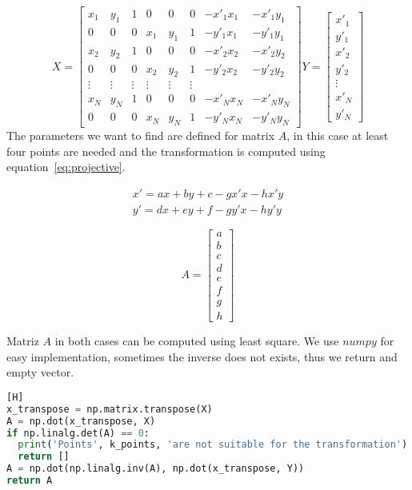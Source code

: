 \begin{itemize}
\[
X = 
\begin{bmatrix}
    x_{1}       & y_{1} & 1 & 0 & 0 & 0 & -x'_1x_1 & -x'_1y_1\\
    0       & 0 & 0 & x_1 & y_1 & 1 & -y'_1x_1 & -y'_1y_1\\
    x_{2}       & y_{2} & 1 & 0 & 0 & 0 & -x'_2x_2 & -x'_2y_2\\
    0       & 0 & 0 & x_2 & y_2 & 1 & -y'_2x_2 & -y'_2y_2 \\
  \vdots & \vdots & \vdots & \vdots & \vdots & \vdots \\

    x_{N}       & y_{N} & 1 & 0 & 0 & 0 & -x'_Nx_N & -x'_Ny_N\\
    0       & 0 & 0 & x_N & y_N & 1 & -y'_Nx_N & -y'_Ny_N 
\end{bmatrix}
%
Y = 
\begin{bmatrix}
    x'_{1} \\
    y'_{1} \\
    x'_{2}      \\
    y'_{2}   \\
 \vdots \\
    x'_{N}      \\
    y'_{N}   
\end{bmatrix}
\]
The parameters we want to find are defined for matrix $A$, in this case at least four points are needed and the transformation is computed using equation~\ref{eq:projective}.

\begin{equation}
\begin{split}
x'= ax+by+c-gx'x-hx'y\\
y'= dx+ey+f -gy'x-hy'y 
\end{split}
\label{eq:projective}
\end{equation}

\[
A = 
\begin{bmatrix}
    a \\
    b \\
    c      \\
    d   \\ 
    e      \\
    f   \\
    g\\
    h
\end{bmatrix}
\]

Matriz $A$ in both cases can be computed using least square. We use $numpy$ for easy implementation, sometimes the inverse does not exists, thus we return and empty vector.
\begin{lstlisting}[language=python][H]
x_transpose = np.matrix.transpose(X)
A = np.dot(x_transpose, X)
if np.linalg.det(A) == 0:
  print('Points', k_points, 'are not suitable for the transformation')
  return []
A = np.dot(np.linalg.inv(A), np.dot(x_transpose, Y))
return A
\end{lstlisting}


\end{itemize}
